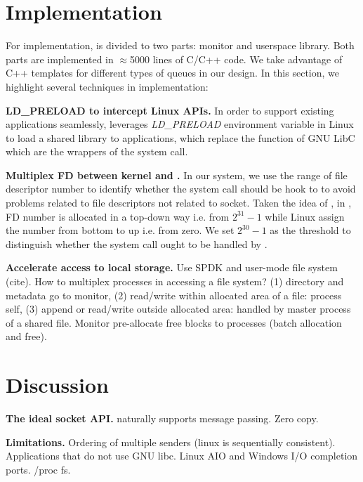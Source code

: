\section{Implementation}
\label{sec:implementation}

For implementation, \libipc is divided to two parts: monitor and userspace library. Both parts are implemented in $\approx$5000 lines of C/C++ code. We take advantage of C++ templates for different types of queues in our design. %
In this section, we highlight several techniques in implementation:


\textbf{LD\_PRELOAD to intercept Linux APIs.}
In order to support existing applications seamlessly, \libipc leverages \textit{LD\_PRELOAD} environment variable in Linux to load a shared library to applications, which replace the function of GNU LibC which are the wrappers of the system call. 

\textbf{Multiplex FD between kernel and \libipc{}.}
In our system, we use the range of file descriptor number to identify whether the system call should be hook to \libipc to avoid problems related to file descriptors not related to socket. Taken the idea of \cite{huang2017high}, in \libipc, FD number is allocated in a top-down way i.e. from $2^{31}-1$ while Linux assign the number from bottom to up i.e. from zero. We set $2^{30} - 1 $ as the threshold to distinguish whether the system call ought to be handled by \libipc.



\textbf{Accelerate access to local storage.}
Use SPDK and user-mode file system (cite). How to multiplex processes in accessing a file system? (1) directory and metadata go to monitor, (2) read/write within allocated area of a file: process self, (3) append or read/write outside allocated area: handled by master process of a shared file. Monitor pre-allocate free blocks to processes (batch allocation and free).

\section{Discussion}
\label{sec:discussion}

\textbf{The ideal socket API.} \sys{} naturally supports message passing. Zero copy.

\textbf{Limitations.}
Ordering of multiple senders (linux is sequentially consistent). Applications that do not use GNU libc. Linux AIO and Windows I/O completion ports. /proc fs.
